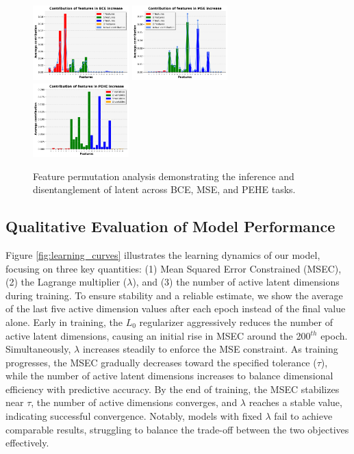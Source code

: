 \documentclass[doubleblind]{ecai}
\begin{document}
	\begin{figure}
		\centering
		
		\includegraphics[width=0.33\textwidth]{Images/bce_increase.png}
		\includegraphics[width=0.33\textwidth]{Images/mse_increase.png}
		\includegraphics[width=0.33\textwidth]{Images/pehe_increase.png}
		
		
		\caption{Feature permutation analysis demonstrating the inference and disentanglement of latent across BCE, MSE, and PEHE tasks.}
		
		\label{fig:permutation}
		
	\end{figure}
	
	\subsection{Qualitative Evaluation of Model Performance}
	
	Figure \ref{fig:learning_curves} illustrates the learning dynamics of our model, focusing on three key quantities: (1) Mean Squared Error Constrained (MSEC), (2) the Lagrange multiplier ($\lambda$), and (3) the number of active latent dimensions during training. To ensure stability and a reliable estimate, we show the average of the last five active dimension values after each epoch instead of the final value alone. Early in training, the $L_0$ regularizer aggressively reduces the number of active latent dimensions, causing an initial rise in MSEC around the 200$^{th}$ epoch. Simultaneously, $\lambda$ increases steadily to enforce the MSE constraint. As training progresses, the MSEC gradually decreases toward the specified tolerance ($\tau$), while the number of active latent dimensions increases to balance dimensional efficiency with predictive accuracy. By the end of training, the MSEC stabilizes near $\tau$, the number of active dimensions converges, and $\lambda$ reaches a stable value, indicating successful convergence. Notably, models with fixed $\lambda$ fail to achieve comparable results, struggling to balance the trade-off between the two objectives effectively. 
	
\end{document}
